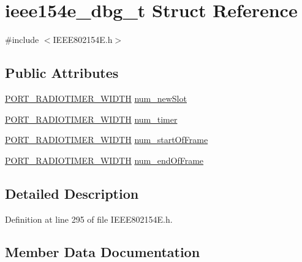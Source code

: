 \hypertarget{structieee154e__dbg__t}{}\section{ieee154e\+\_\+dbg\+\_\+t Struct Reference}
\label{structieee154e__dbg__t}


{\ttfamily \#include $<$I\+E\+E\+E802154\+E.\+h$>$}

\subsection*{Public Attributes}
\begin{DoxyCompactItemize}
\item 
\hyperlink{z1_2board__info_8h_ac16e02aadd749b2d27638bed1a805a59}{P\+O\+R\+T\+\_\+\+R\+A\+D\+I\+O\+T\+I\+M\+E\+R\+\_\+\+W\+I\+D\+TH} \hyperlink{structieee154e__dbg__t_aab19eb6968fe6a1aa094253a3c242a9a}{num\+\_\+new\+Slot}
\item 
\hyperlink{z1_2board__info_8h_ac16e02aadd749b2d27638bed1a805a59}{P\+O\+R\+T\+\_\+\+R\+A\+D\+I\+O\+T\+I\+M\+E\+R\+\_\+\+W\+I\+D\+TH} \hyperlink{structieee154e__dbg__t_aafebfb91f54e47303e95f65129709512}{num\+\_\+timer}
\item 
\hyperlink{z1_2board__info_8h_ac16e02aadd749b2d27638bed1a805a59}{P\+O\+R\+T\+\_\+\+R\+A\+D\+I\+O\+T\+I\+M\+E\+R\+\_\+\+W\+I\+D\+TH} \hyperlink{structieee154e__dbg__t_aaf8561d6f250562da222cf0e2bbcaa0b}{num\+\_\+start\+Of\+Frame}
\item 
\hyperlink{z1_2board__info_8h_ac16e02aadd749b2d27638bed1a805a59}{P\+O\+R\+T\+\_\+\+R\+A\+D\+I\+O\+T\+I\+M\+E\+R\+\_\+\+W\+I\+D\+TH} \hyperlink{structieee154e__dbg__t_acf2d16e146a5b5ce49d013d13da1a00d}{num\+\_\+end\+Of\+Frame}
\end{DoxyCompactItemize}


\subsection{Detailed Description}


Definition at line 295 of file I\+E\+E\+E802154\+E.\+h.



\subsection{Member Data Documentation}
